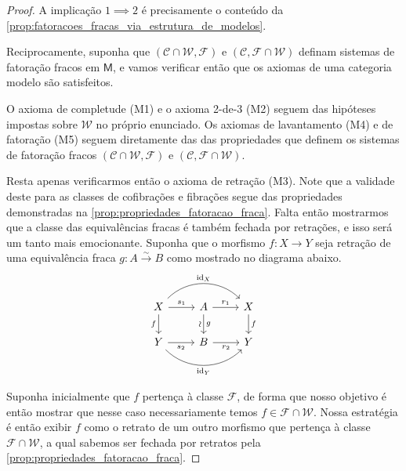 \begin{proof}
  A implicação $1 \implies 2$ é precisamente o conteúdo da \cref{prop:fatoracoes_fracas_via_estrutura_de_modelos}.

  Reciprocamente, suponha que $(\mathcal{C} \cap \mathcal{W},\mathcal{F})$ e $(\mathcal{C}, \mathcal{F} \cap \mathcal{W})$ definam sistemas de fatoração fracos em $\mathsf{M}$, e vamos verificar então que os axiomas de uma categoria modelo são satisfeitos.
  
  O axioma de completude (M1) e o axioma 2-de-3 (M2) seguem das hipóteses impostas sobre $\mathcal{W}$ no próprio enunciado.
  Os axiomas de lavantamento (M4) e de fatoração (M5) seguem diretamente das das propriedades que definem os sistemas de fatoração fracos $(\mathcal{C} \cap \mathcal{W},\mathcal{F})$ e $(\mathcal{C},\mathcal{F} \cap \mathcal{W})$.

  Resta apenas verificarmos então o axioma de retração (M3).
  Note que a validade deste para as classes de cofibrações e fibrações segue das propriedades demonstradas na \cref{prop:propriedades_fatoracao_fraca}.
  Falta então mostrarmos que a classe das equivalências fracas é também fechada por retrações, e isso será um tanto mais emocionante.
  Suponha que o morfismo $f: X \to Y$ seja retração de uma equivalência fraca $g: A \overset{\sim}{\to} B$ como mostrado no diagrama abaixo.
  \begin{equation}
    \label{eq:estrutura_de_modelos_via_fatoracao_fraca_diag_1}
    \begin{tikzcd}
      X
      \arrow[d, "f" swap]
      \arrow[r, "s_{1}"]
      \arrow[rr, bend left=45, "\id_{X}"]
      & A
      \arrow[d, "g", "\sim" {swap,sloped}]
      \arrow[r, "r_{1}"]
      & X
      \arrow[d, "f"]
      \\ Y
      \arrow[r, "s_{2}" swap]
      \arrow[rr, bend right=45, "\id_{Y}" swap]
      & B
      \arrow[r, "r_{2}" swap]
      & Y
    \end{tikzcd}
  \end{equation}

  Suponha inicialmente que $f$ pertença à classe $\mathcal{F}$, de forma que nosso objetivo é então mostrar que nesse caso necessariamente temos $f \in \mathcal{F} \cap \mathcal{W}$.
  Nossa estratégia é então exibir $f$ como o retrato de um outro morfismo que pertença à classe $\mathcal{F} \cap \mathcal{W}$, a qual sabemos ser fechada por retratos pela \cref{prop:propriedades_fatoracao_fraca}.
  

\end{proof}
